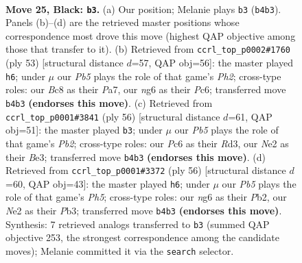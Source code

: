 \documentclass[11pt]{article}
\begin{document}
\clearpage

\begin{figure}[p]\centering
\begin{subfigure}{0.46\textwidth}\centering
\resizebox{\linewidth}{!}{%
\newchessgame
\chessboard[
  setfen={r1bk4/8/2p1p1N1/P1b4p/1p3P1P/4P3/3Bn2K/RN6 b - - 0 25},
  showmover=false,
  pgfstyle=straightmove, color=movearrow, markmove={b4-b3}
]}
\caption{}
\end{subfigure}\hfill
\begin{subfigure}{0.46\textwidth}\centering
\resizebox{\linewidth}{!}{%
\newchessgame
\chessboard[
  setfen={6r1/pk3p1p/2pp1b2/3n4/3P4/2P2KP1/1P1BN3/7R b - - 0 27},
  showmover=false,
  pgfstyle=straightmove, color=movearrow, markmove={h7-h6}
]}
\caption{}
\end{subfigure}
\\[4pt]
\begin{subfigure}{0.46\textwidth}\centering
\resizebox{\linewidth}{!}{%
\newchessgame
\chessboard[
  setfen={4r3/1pp3b1/3pn1k1/p2N2p1/P1P5/3RBKPP/1P6/8 w - - 2 29},
  showmover=false,
  pgfstyle=straightmove, color=movearrow, markmove={b2-b3}
]}
\caption{}
\end{subfigure}\hfill
\begin{subfigure}{0.46\textwidth}\centering
\resizebox{\linewidth}{!}{%
\newchessgame
\chessboard[
  setfen={4k1r1/p7/2pP1bp1/1p3p1P/1n6/1PN1PRB1/1P6/6K1 w - - 1 29},
  showmover=false,
  pgfstyle=straightmove, color=movearrow, markmove={h5-h6}
]}
\caption{}
\end{subfigure}
\caption{\textbf{Move 25, Black: \texttt{b3}.} (a) Our position; Melanie plays \texttt{b3} (\texttt{b4b3}). Panels (b)--(d) are the retrieved master positions whose correspondence most drove this move (highest QAP objective among those that transfer to it). (b) Retrieved from \texttt{ccrl\_top\_p0002\#1760} (ply 53) [structural distance $d$=57, QAP obj=56]: the master played \texttt{h6}; under $\mu$ our \emph{Pb5} plays the role of that game's \emph{Ph2}; cross-type roles: our \emph{B}c8 as their \emph{P}a7, our \emph{n}g6 as their \emph{P}c6; transferred move \texttt{b4b3} \textbf{(endorses this move)}. (c) Retrieved from \texttt{ccrl\_top\_p0001\#3841} (ply 56) [structural distance $d$=61, QAP obj=51]: the master played \texttt{b3}; under $\mu$ our \emph{Pb5} plays the role of that game's \emph{Pb2}; cross-type roles: our \emph{P}c6 as their \emph{R}d3, our \emph{N}e2 as their \emph{B}e3; transferred move \texttt{b4b3} \textbf{(endorses this move)}. (d) Retrieved from \texttt{ccrl\_top\_p0001\#3372} (ply 56) [structural distance $d$=60, QAP obj=43]: the master played \texttt{h6}; under $\mu$ our \emph{Pb5} plays the role of that game's \emph{Ph5}; cross-type roles: our \emph{n}g6 as their \emph{P}b2, our \emph{N}e2 as their \emph{P}b3; transferred move \texttt{b4b3} \textbf{(endorses this move)}. Synthesis: 7 retrieved analogs transferred to \texttt{b3} (summed QAP objective 253, the strongest correspondence among the candidate moves); Melanie committed it via the \texttt{search} selector.}
\label{fig:thought-m49}
\end{figure}
\end{document}
